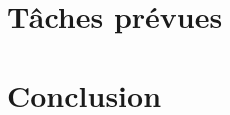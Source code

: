\documentclass[a4paper,12pt]{article}
\begin{document}
\newpage

\section{Tâches prévues}

\newpage

\section*{Conclusion}
\end{document}
